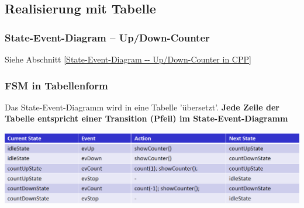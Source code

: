 

\begin{minipage}[t]{0.44\columnwidth}
    
\end{minipage}
\hfill
\begin{minipage}[t]{0.52\columnwidth}
    
\end{minipage}


 



\columnbreak





\subsection{Realisierung mit Tabelle}

\subsubsection{State-Event-Diagram -- Up/Down-Counter}

Siehe Abschnitt \ref{State-Event-Diagram -- Up/Down-Counter in CPP}


\subsubsection{FSM in Tabellenform}

Das State-Event-Diagramm wird in eine Tabelle 'übersetzt'. \textbf{Jede Zeile der Tabelle entspricht einer Transition (Pfeil) im 
State-Event-Diagramm}

\includegraphics[width=\columnwidth]{images/fsm_tabelle.png}


